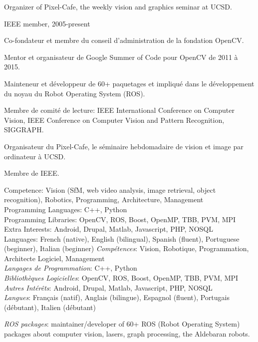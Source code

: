 \documentclass{article}
\begin{document}
\begin{llist}
{Organizer of Pixel-Cafe, the weekly vision and graphics seminar at UCSD.

IEEE member, 2005-present
}
{

Co-fondateur et membre du conseil d'administration de la fondation OpenCV.

Mentor et organisateur de Google Summer of Code pour OpenCV de 2011 \`{a} 2015.

Mainteneur et d\'{e}veloppeur de 60+ paquetages et impliqu\'{e} dans le d\'{e}veloppement du
noyau du Robot Operating System (ROS).

Membre de comit\'{e} de lecture: IEEE International Conference on Computer Vision, IEEE Conference on Computer Vision 
and Pattern Recognition, SIGGRAPH.

Organisateur du Pixel-Cafe, le s\'{e}minaire hebdomadaire de vision et image par ordinateur \`{a} UCSD.

Membre de IEEE.
}

{
Competence: Vision (SfM, web video analysis, image retrieval, object recognition), Robotics, Programming, Architecture, 
Management \\
Programming Languages: C++, Python\\
Programming Libraries: OpenCV, ROS, Boost, OpenMP, TBB, PVM, MPI \\
Extra Interests: Android, Drupal, Matlab, Javascript, PHP, NOSQL \\
Languages: French (native), English (bilingual), Spanish (fluent), Portuguese (beginner), Italian (beginner)
}
{
{\em Comp\'{e}tences}: Vision, Robotique, Programmation, Architecte Logiciel, Management\\
{\em Langages de Programmation}: C++, Python\\
{\em Biblioth\`{e}ques Logicielles}: OpenCV, ROS, Boost, OpenMP, TBB, PVM, MPI \\
{\em Autres Int\'{e}r\^{e}ts}: Android, Drupal, Matlab, Javascript, PHP, NOSQL \\
{\em Langues}: Fran\c{c}ais (natif), Anglais (bilingue), Espagnol (fluent), Portugais (d\'{e}butant), Italien
(d\'{e}butant)
}

{
{\em ROS packages}: maintainer/developer of 60+ ROS (Robot Operating System) packages about computer vision, lasers, 
graph processing, the Aldebaran robots.

}
\end{llist}
\end{document}
